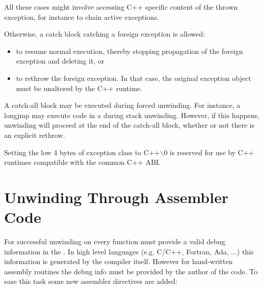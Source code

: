 All these cases might involve accessing C++ specific content of the
thrown exception, for instance to chain active exceptions.

Otherwise, a catch block catching a foreign exception is allowed:
\begin{itemize}
\item to resume normal execution, thereby stopping propagation of
      the foreign exception and deleting it, or
\item to rethrow the foreign exception. In that case, the original
      exception object must be unaltered by the C++ runtime.
\end{itemize}

A catch-all block may be executed during forced unwinding.  For
instance, a longjmp may execute code in a  during
stack unwinding. However, if this happens, unwinding will proceed at
the end of the catch-all block, whether or not there is an explicit
rethrow.

Setting the low 4 bytes of exception class to C++$\backslash$0 is reserved
for use by C++ runtimes compatible with the common C++ ABI.

\section{Unwinding Through Assembler Code}

For successful unwinding on \xARCH every function must provide a valid
debug information in the . In high level languages (e.g. C/C++, Fortran, Ada, ...)
this information is generated by the compiler itself. However for
hand-written assembly routines the debug info must be provided by the
author of the code. To ease this task some new assembler directives
are added:

